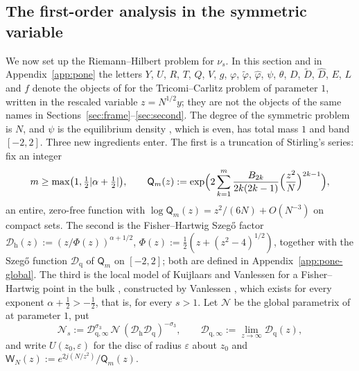 \subsection{The first-order analysis in the symmetric variable}\label{sec:pone-first}

We now set up the Riemann--Hilbert problem for $\nu_s$. In this section and in Appendix~\ref{app:pone} the letters $Y$,
$U$, $R$, $T$, $Q$, $V$, $g$, $\varphi$, $\tilde\varphi$, $\hat\varphi$, $\psi$, $\theta$, $D$, $\tilde D$, $\hat D$, $E$, $L$
and $f$ denote the objects of \cite{WLXZ} for the Tricomi--Carlitz problem of parameter $1$, written in the rescaled
variable $z=N^{1/2}y$; they are not the objects of the same names in Sections~\ref{sec:frame}--\ref{sec:second}. The
degree of the symmetric problem is $N$, and $\psi$ is the equilibrium density \cite[(2.1)]{WLXZ}, which is even, has
total mass $1$ and band $[-2,2]$. Three new ingredients enter. The first is a truncation of Stirling's series: fix an
integer
\[
  m\ge\max\bigl(1,\tfrac12|\alpha+\tfrac12|\bigr),\qquad
  \mathsf Q_m(z):=\exp\Bigl(2\sum_{k=1}^m\frac{B_{2k}}{2k(2k-1)}\Bigl(\frac{z^2}N\Bigr)^{2k-1}\Bigr),
\]
an entire, zero-free function with $\log\mathsf Q_m(z)=z^2/(6N)+O(N^{-3})$ on compact sets. The second is the
Fisher--Hartwig Szeg\H{o} factor $\mathcal D_{\mathrm h}(z):=(z/\Phi(z))^{\alpha+1/2}$, $\Phi(z):=\frac12(z+(z^2-4)^{1/2})$,
together with the Szeg\H{o} function $\mathcal D_{\mathrm q}$ of $\mathsf Q_m$ on $[-2,2]$; both are defined in
Appendix~\ref{app:pone-global}. The third is the local model of Kuijlaars and Vanlessen for a Fisher--Hartwig point in
the bulk \cite[\S5]{KV}, constructed by Vanlessen \cite[(4.26)--(4.33)]{Van}, which exists for every exponent
$\alpha+\frac12>-\frac12$, that is, for every $s>1$. Let $\mathcal N$ be the global parametrix of \cite[(5.11)]{WLXZ} at
parameter $1$, put
\[
  \mathcal N_s:=\mathcal D_{\mathrm q,\infty}^{\sigma_3}\,\mathcal N\,(\mathcal D_{\mathrm h}\mathcal D_{\mathrm q})^{-\sigma_3},
  \qquad \mathcal D_{\mathrm q,\infty}:=\lim_{z\to\infty}\mathcal D_{\mathrm q}(z),
\]
and write $U(z_0,\varepsilon)$ for the disc of radius $\varepsilon$ about $z_0$ and
$\mathsf W_N(z):=e^{2j(N/z^2)}/\mathsf Q_m(z)$.

